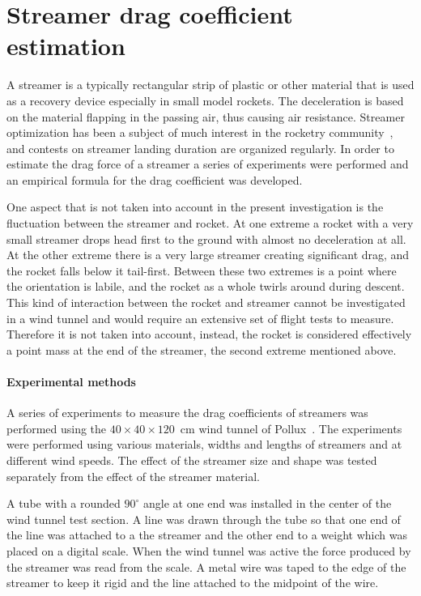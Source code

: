 \chapter{Streamer drag coefficient estimation}
\label{app-streamers}


A streamer is a typically rectangular strip of plastic or other
material that is used as a recovery device especially in small model
rockets.  The deceleration is based on the material flapping in the
passing air, thus causing air resistance.  Streamer optimization has
been a subject of much interest in the rocketry
community~\cite{streamer-optimization}, and contests on streamer
landing duration are organized regularly.  In order to estimate the
drag force of a streamer a series of experiments were performed and an
empirical formula for the drag coefficient was developed.

One aspect that is not taken into account in the present investigation
is the fluctuation between the streamer and rocket.  At one extreme a
rocket with a very small streamer drops head first to the ground with
almost no deceleration at all.  At the other extreme there is a very
large streamer creating significant drag, and the rocket falls below
it tail-first.  Between these two extremes is a point where the
orientation is labile, and the rocket as a whole twirls
around during descent.  This kind of interaction between the rocket
and streamer cannot be investigated in a wind tunnel and would require
an extensive set of flight tests to measure.  Therefore it is not
taken into account, instead, the rocket is considered effectively a
point mass at the end of the streamer, the second extreme mentioned
above.


\subsubsection*{Experimental methods}

A series of experiments to measure the drag coefficients of streamers
was performed using the $40\times40\times120$~cm wind tunnel of
Pollux~\cite{pollux-wind-tunnel}.  The experiments were performed
using various materials, widths and lengths of streamers and at
different wind speeds.  The effect of the streamer size and shape was
tested separately from the effect of the streamer material.

A tube with a rounded $90^\circ$ angle at one end was installed in the
center of the wind tunnel test section.  A line was drawn through the
tube so that one end of the line was attached to a the streamer and the
other end to a weight which was placed on a digital scale.  When the
wind tunnel was active the force produced by the streamer was read
from the scale.  A metal wire was taped to the edge of the streamer to
keep it rigid and the line attached to the midpoint of the wire.

